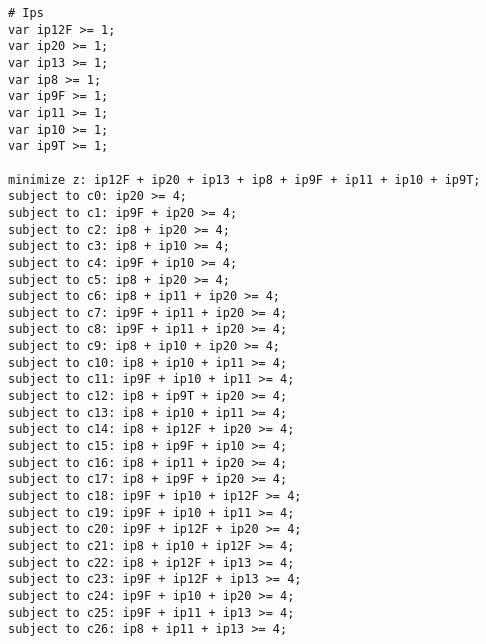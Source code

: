 \begin{lstlisting}
# Ips
var ip12F >= 1;
var ip20 >= 1;
var ip13 >= 1;
var ip8 >= 1;
var ip9F >= 1;
var ip11 >= 1;
var ip10 >= 1;
var ip9T >= 1;

minimize z: ip12F + ip20 + ip13 + ip8 + ip9F + ip11 + ip10 + ip9T;
subject to c0: ip20 >= 4;
subject to c1: ip9F + ip20 >= 4;
subject to c2: ip8 + ip20 >= 4;
subject to c3: ip8 + ip10 >= 4;
subject to c4: ip9F + ip10 >= 4;
subject to c5: ip8 + ip20 >= 4;
subject to c6: ip8 + ip11 + ip20 >= 4;
subject to c7: ip9F + ip11 + ip20 >= 4;
subject to c8: ip9F + ip11 + ip20 >= 4;
subject to c9: ip8 + ip10 + ip20 >= 4;
subject to c10: ip8 + ip10 + ip11 >= 4;
subject to c11: ip9F + ip10 + ip11 >= 4;
subject to c12: ip8 + ip9T + ip20 >= 4;
subject to c13: ip8 + ip10 + ip11 >= 4;
subject to c14: ip8 + ip12F + ip20 >= 4;
subject to c15: ip8 + ip9F + ip10 >= 4;
subject to c16: ip8 + ip11 + ip20 >= 4;
subject to c17: ip8 + ip9F + ip20 >= 4;
subject to c18: ip9F + ip10 + ip12F >= 4;
subject to c19: ip9F + ip10 + ip11 >= 4;
subject to c20: ip9F + ip12F + ip20 >= 4;
subject to c21: ip8 + ip10 + ip12F >= 4;
subject to c22: ip8 + ip12F + ip13 >= 4;
subject to c23: ip9F + ip12F + ip13 >= 4;
subject to c24: ip9F + ip10 + ip20 >= 4;
subject to c25: ip9F + ip11 + ip13 >= 4;
subject to c26: ip8 + ip11 + ip13 >= 4;
\end{lstlisting}
